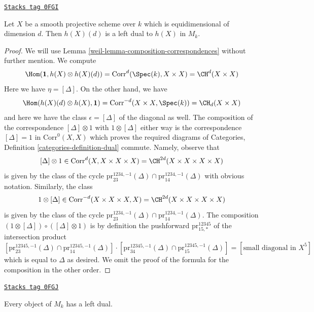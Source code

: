 \begin{lemma}[Dual]
\label{weil-lemma-dual}
\href{https://stacks.math.columbia.edu/tag/0FGI}{\texttt{Stacks tag 0FGI}}

Let $X$ be a smooth projective scheme over $k$ which is equidimensional
of dimension $d$. Then $h(X)(d)$ is a left dual to $h(X)$ in $M_k$.
\end{lemma}

\begin{proof}

We will use Lemma \ref{weil-lemma-composition-correspondences}
without further mention. We compute
$$
\Hom(\mathbf{1}, h(X) \otimes h(X)(d)) =
\text{Corr}^d(\Spec(k), X \times X) = \CH^d(X \times X)
$$
Here we have $\eta = [\Delta]$. On the other hand, we have
$$
\Hom(h(X)(d) \otimes h(X), \mathbf{1}) =
\text{Corr}^{-d}(X \times X, \Spec(k)) = \CH_d(X \times X)
$$
and here we have the class $\epsilon = [\Delta]$
of the diagonal as well. The composition of the correspondence
$[\Delta] \otimes 1$ with $1 \otimes [\Delta]$ either way
is the correspondence $[\Delta] = 1$ in $\text{Corr}^0(X, X)$ which proves
the required diagrams of
Categories, Definition \ref{categories-definition-dual} commute.
Namely, observe that
$$
[\Delta] \otimes 1 \in \text{Corr}^d(X, X \times X \times X) =
\CH^{2d}(X \times X \times X \times X)
$$
is given by the class of the cycle
$\text{pr}^{1234, -1}_{23}(\Delta) \cap \text{pr}^{1234, -1}_{14}(\Delta)$ with
obvious notation. Similarly, the class
$$
1 \otimes [\Delta] \in \text{Corr}^{-d}(X \times X \times X, X) =
\CH^{2d}(X \times X \times X \times X)
$$
is given by the class of the cycle
$\text{pr}^{1234, -1}_{23}(\Delta) \cap \text{pr}^{1234, -1}_{14}(\Delta)$.
The composition $(1 \otimes [\Delta]) \circ ([\Delta] \otimes 1)$
is by definition the pushforward $\text{pr}^{12345}_{15, *}$
of the intersection product
$$
[\text{pr}^{12345, -1}_{23}(\Delta) \cap \text{pr}^{12345, -1}_{14}(\Delta)]
\cdot
[\text{pr}^{12345, -1}_{34}(\Delta) \cap \text{pr}^{12345, -1}_{15}(\Delta)]
=
[\text{small diagonal in } X^5]
$$
which is equal to $\Delta$ as desired. We omit the proof of the formula
for the composition in the other order.
\end{proof}

\begin{lemma}
\label{weil-lemma-dual-general}
\href{https://stacks.math.columbia.edu/tag/0FGJ}{\texttt{Stacks tag 0FGJ}}

Every object of $M_k$ has a left dual.
\end{lemma}

